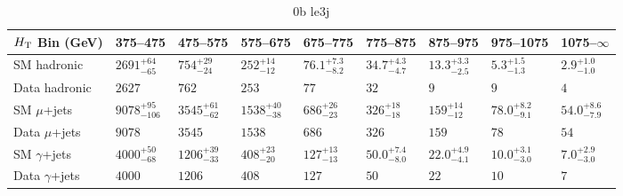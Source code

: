\documentclass[8pt]{article}
\def\scalht{\mbox{$H_{\rm{T}}$}\xspace}
\newcommand\T{\rule{0pt}{2.6ex}}
\newcommand\B{\rule[-1.2ex]{0pt}{0pt}}
\begin{document}
\begin{table}[ht!]
\caption{0b le3j}
\label{tab:ensemble-0b le3j}
\centering
\begin{tabular}{ lllllllll }

\hline
\scalht Bin (GeV)       & 375--475                       & 475--575                       & 575--675                       & 675--775                       & 775--875                       & 875--975                       & 975--1075                      & 1075--$\infty$                 \\ [1.000000ex]
\hline
SM hadronic\T           & $2691^{+64}_{-65}$             & $754^{+29}_{-24}$              & $252^{+14}_{-12}$              & $76.1^{+7.3}_{-8.2}$           & $34.7^{+4.3}_{-4.7}$           & $13.3^{+3.3}_{-2.5}$           & $5.3^{+1.5}_{-1.3}$            & $2.9^{+1.0}_{-1.0}$            \\ 
Data hadronic\B         & $2627$                         & $762$                          & $253$                          & $77$                           & $32$                           & $9$                            & $9$                            & $4$                            \\ 
\hline
SM $\mu$+jets\T         & $9078^{+95}_{-106}$            & $3545^{+61}_{-62}$             & $1538^{+40}_{-38}$             & $686^{+26}_{-23}$              & $326^{+18}_{-18}$              & $159^{+14}_{-12}$              & $78.0^{+8.2}_{-9.1}$           & $54.0^{+8.6}_{-7.9}$           \\ 
Data $\mu$+jets\B       & $9078$                         & $3545$                         & $1538$                         & $686$                          & $326$                          & $159$                          & $78$                           & $54$                           \\ 
\hline
SM $\gamma$+jets\T      & $4000^{+50}_{-68}$             & $1206^{+39}_{-33}$             & $408^{+23}_{-20}$              & $127^{+13}_{-13}$              & $50.0^{+7.4}_{-8.0}$           & $22.0^{+4.9}_{-4.1}$           & $10.0^{+3.1}_{-3.0}$           & $7.0^{+2.9}_{-3.0}$            \\ 
Data $\gamma$+jets\B    & $4000$                         & $1206$                         & $408$                          & $127$                          & $50$                           & $22$                           & $10$                           & $7$                            \\ 
\hline

\end{tabular}
\end{table}
\end{document}
